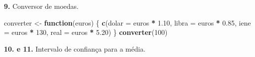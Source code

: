 \documentclass[
  portuguese,
  11pt,
  openany]{book}
\newenvironment{Shaded}{\begin{snugshade}}{\end{snugshade}}
\newcommand{\AttributeTok}[1]{\textcolor[rgb]{0.13,0.29,0.53}{#1}}
\newcommand{\ControlFlowTok}[1]{\textcolor[rgb]{0.13,0.29,0.53}{\textbf{#1}}}
\newcommand{\DecValTok}[1]{\textcolor[rgb]{0.00,0.00,0.81}{#1}}
\newcommand{\FloatTok}[1]{\textcolor[rgb]{0.00,0.00,0.81}{#1}}
\newcommand{\FunctionTok}[1]{\textcolor[rgb]{0.13,0.29,0.53}{\textbf{#1}}}
\newcommand{\NormalTok}[1]{#1}
\newcommand{\OtherTok}[1]{\textcolor[rgb]{0.56,0.35,0.01}{#1}}
\newcommand{\SpecialCharTok}[1]{\textcolor[rgb]{0.81,0.36,0.00}{\textbf{#1}}}
\begin{document}
\textbf{9.} Conversor de moedas.

\begin{Shaded}
\begin{Highlighting}[]
\NormalTok{converter }\OtherTok{\textless{}{-}} \ControlFlowTok{function}\NormalTok{(euros) \{}
  \FunctionTok{c}\NormalTok{(}\AttributeTok{dolar =}\NormalTok{ euros }\SpecialCharTok{*} \FloatTok{1.10}\NormalTok{, }\AttributeTok{libra =}\NormalTok{ euros }\SpecialCharTok{*} \FloatTok{0.85}\NormalTok{,}
    \AttributeTok{iene  =}\NormalTok{ euros }\SpecialCharTok{*} \DecValTok{130}\NormalTok{,  }\AttributeTok{real  =}\NormalTok{ euros }\SpecialCharTok{*} \FloatTok{5.20}\NormalTok{)}
\NormalTok{\}}
\FunctionTok{converter}\NormalTok{(}\DecValTok{100}\NormalTok{)}
\end{Highlighting}
\end{Shaded}

\textbf{10. e 11.} Intervalo de confiança para a média.
\end{document}
